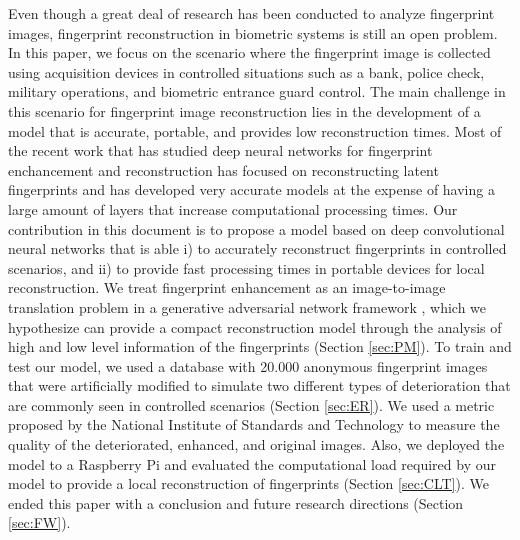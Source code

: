\documentclass[a4paper,fleqn]{cas-dc}
\begin{document}
Even though a great deal of research has been conducted to analyze fingerprint images, fingerprint reconstruction in biometric systems is still an open problem. In this paper, we focus on the scenario where the fingerprint image is collected using acquisition devices in controlled situations such as a bank, police check, military operations, and biometric entrance guard control. The main challenge in this scenario for fingerprint image reconstruction lies in the development of a model that is accurate, portable, and provides low reconstruction times. Most of the recent work that has studied deep neural networks for fingerprint enchancement and reconstruction has focused on reconstructing latent fingerprints and has developed very accurate models at the expense of having a large amount of layers that increase computational processing times. Our contribution in this document is to propose a model based on deep convolutional neural networks that is able i) to accurately reconstruct fingerprints in controlled scenarios, and ii) to provide fast processing times in portable devices for local reconstruction. We treat fingerprint enhancement as an image-to-image translation problem in a generative adversarial network framework \cite{ITITAN,goodfellow2016deep}, which we hypothesize can provide a compact reconstruction model through the analysis of high and low level information of the fingerprints (Section \ref{sec:PM}). To train and test our model, we used a database with 20.000 anonymous fingerprint images that were artificially modified to simulate two different types of deterioration that are commonly seen in controlled scenarios (Section \ref{sec:ER}). We used a metric proposed by the National Institute of Standards and Technology to measure the quality of the deteriorated, enhanced, and original images. Also, we deployed the model to a Raspberry Pi and evaluated the computational load required by our model to provide a local reconstruction of fingerprints (Section \ref{sec:CLT}). We ended this paper with a conclusion and future research directions (Section \ref{sec:FW}). 


     
\end{document}
